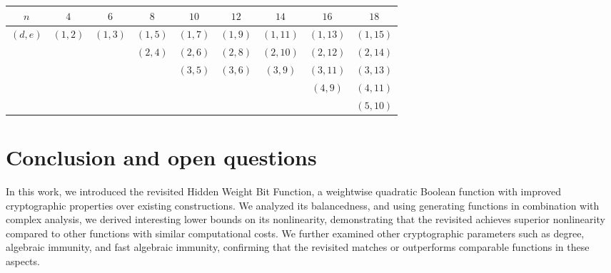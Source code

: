 \documentclass{llncs}
\begin{document}

\begin{table}
	\scriptsize
	\centering
	\begin{tabular}{|c|c|c|c|c|c|c|c|c|}
		\hline
		$ n $      & $4$     & $6$     & $8$     & $10$    & $12$    & $14$    & $16$    & $18$    \\
		\hline
		$(d, e)$ & $(1,2)$ & $(1,3)$ & $(1,5)$  & $(1,7)$ & $(1,9)$ & $(1,11)$ & $(1,13)$ & $(1,15)$ \\ 
		&     &    & $(2,4)$  & $(2,6)$ & $(2,8)$ & $(2,10)$ & $(2,12)$ & $(2,14)$\\ 
		&     &    &     & $(3,5)$ & $(3,6)$ & $(3,9)$ & $(3,11)$ & $(3,13)$\\ 
		&     &    &     &  &  &  & $(4,9)$ & $(4,11)$\\ 
	 	&     &    &     &  &  &  &  & $(5,10)$ \\
		\hline
	\end{tabular}
	\label{table:FAI}
\end{table}

\section{Conclusion and open questions}

In this work, we introduced the revisited Hidden Weight Bit Function, a weightwise quadratic Boolean function with improved cryptographic properties over existing constructions. We analyzed its balancedness, and using generating functions in combination with complex analysis, we derived interesting lower bounds on its nonlinearity, demonstrating that the revisited \hwbf{} achieves superior nonlinearity compared to other functions with similar computational costs. We further examined other cryptographic parameters such as degree, algebraic immunity, and fast algebraic immunity, confirming that the revisited \hwbf{} matches or outperforms comparable functions in these aspects.
\end{document}
